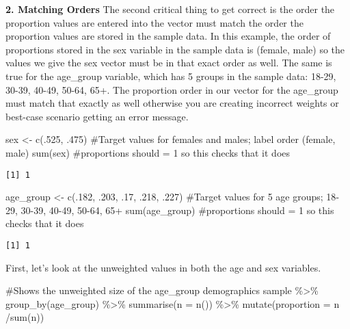 \documentclass[
  letterpaper,
  DIV=11,
  numbers=noendperiod]{scrreprt}
\newenvironment{Shaded}{\begin{snugshade}}{\end{snugshade}}
\newcommand{\AttributeTok}[1]{\textcolor[rgb]{0.40,0.45,0.13}{#1}}
\newcommand{\CommentTok}[1]{\textcolor[rgb]{0.37,0.37,0.37}{#1}}
\newcommand{\DecValTok}[1]{\textcolor[rgb]{0.68,0.00,0.00}{#1}}
\newcommand{\FunctionTok}[1]{\textcolor[rgb]{0.28,0.35,0.67}{#1}}
\newcommand{\NormalTok}[1]{\textcolor[rgb]{0.00,0.23,0.31}{#1}}
\newcommand{\OtherTok}[1]{\textcolor[rgb]{0.00,0.23,0.31}{#1}}
\newcommand{\SpecialCharTok}[1]{\textcolor[rgb]{0.37,0.37,0.37}{#1}}
\begin{document}
\textbf{2. Matching Orders} The second critical thing to get correct is
the order the proportion values are entered into the vector must match
the order the proportion values are stored in the sample data. In this
example, the order of proportions stored in the sex variable in the
sample data is (female, male) so the values we give the sex vector must
be in that exact order as well. The same is true for the age\_group
variable, which has 5 groups in the sample data: 18-29, 30-39, 40-49,
50-64, 65+. The proportion order in our vector for the age\_group must
match that exactly as well otherwise you are creating incorrect weights
or best-case scenario getting an error message.

\begin{Shaded}
\begin{Highlighting}[]
\NormalTok{sex }\OtherTok{\textless{}{-}} \FunctionTok{c}\NormalTok{(.}\DecValTok{525}\NormalTok{, .}\DecValTok{475}\NormalTok{)  }\CommentTok{\#Target values for females and males; label order (female, male)}
\FunctionTok{sum}\NormalTok{(sex) }\CommentTok{\#proportions should = 1 so this checks that it does}
\end{Highlighting}
\end{Shaded}

\begin{verbatim}
[1] 1
\end{verbatim}

\begin{Shaded}
\begin{Highlighting}[]
\NormalTok{age\_group  }\OtherTok{\textless{}{-}} \FunctionTok{c}\NormalTok{(.}\DecValTok{182}\NormalTok{, .}\DecValTok{203}\NormalTok{, .}\DecValTok{17}\NormalTok{, .}\DecValTok{218}\NormalTok{, .}\DecValTok{227}\NormalTok{)  }\CommentTok{\#Target values for 5 age groups; 18{-}29, 30{-}39, 40{-}49, 50{-}64, 65+}
\FunctionTok{sum}\NormalTok{(age\_group) }\CommentTok{\#proportions should = 1 so this checks that it does}
\end{Highlighting}
\end{Shaded}

\begin{verbatim}
[1] 1
\end{verbatim}

First, let's look at the unweighted values in both the age and sex
variables.

\begin{Shaded}
\begin{Highlighting}[]
\CommentTok{\#Shows the unweighted size of the age\_group demographics}
\NormalTok{sample }\SpecialCharTok{\%\textgreater{}\%}
  \FunctionTok{group\_by}\NormalTok{(age\_group) }\SpecialCharTok{\%\textgreater{}\%}
  \FunctionTok{summarise}\NormalTok{(}\AttributeTok{n =} \FunctionTok{n}\NormalTok{()) }\SpecialCharTok{\%\textgreater{}\%} 
  \FunctionTok{mutate}\NormalTok{(}\AttributeTok{proportion =}\NormalTok{ n }\SpecialCharTok{/}\FunctionTok{sum}\NormalTok{(n))}
\end{Highlighting}
\end{Shaded}
\end{document}
